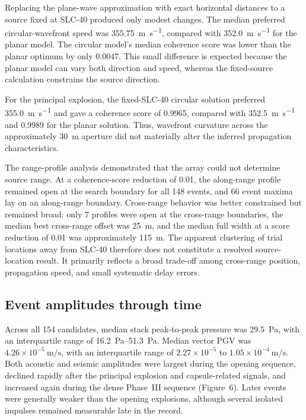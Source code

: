 \documentclass[12pt]{article}
\begin{document}
Replacing the plane-wave approximation with exact horizontal distances to a
source fixed at SLC-40 produced only modest changes. The median preferred
circular-wavefront speed was \SI{355.75}{\metre\per\second}, compared with
\SI{352.0}{\metre\per\second} for the planar model. The circular model's median
coherence score was lower than the planar optimum by only 0.0047. This small
difference is expected because the planar model can vary both direction and
speed, whereas the fixed-source calculation constrains the source direction.

For the principal explosion, the fixed-SLC-40 circular solution preferred
\SI{355.0}{\metre\per\second} and gave a coherence score of 0.9965, compared
with \SI{352.5}{\metre\per\second} and 0.9989 for the planar solution. Thus,
wavefront curvature across the approximately \SI{30}{\metre} aperture did not
materially alter the inferred propagation characteristics.

The range-profile analysis demonstrated that the array could not determine
source range. At a coherence-score reduction of 0.01, the along-range profile
remained open at the search boundary for all 148 events, and 66 event maxima lay
on an along-range boundary. Cross-range behavior was better constrained but
remained broad: only 7 profiles were open at the cross-range boundaries, the
median best cross-range offset was \SI{25}{\metre}, and the median full width at
a score reduction of 0.01 was approximately \SI{115}{\metre}. The apparent
clustering of trial locations away from SLC-40 therefore does not constitute a
resolved source-location result. It primarily reflects a broad trade-off among
cross-range position, propagation speed, and small systematic delay errors.

\subsection{Event amplitudes through time}

Across all 154 candidates, median stack peak-to-peak pressure was
\SI{29.5}{\pascal}, with an interquartile range of
\SIrange{16.2}{51.3}{\pascal}. Median vector PGV was
$4.26\times10^{-5}\ \si{\metre\per\second}$, with an interquartile range of
$2.27\times10^{-5}$ to
$1.05\times10^{-4}\ \si{\metre\per\second}$. Both acoustic and seismic
amplitudes were largest during the opening sequence, declined rapidly after the
principal explosion and capsule-related signals, and increased again during the
dense Phase~III sequence (Figure~6). Later events were generally weaker than the
opening explosions, although several isolated impulses remained measurable late
in the record.
\end{document}
